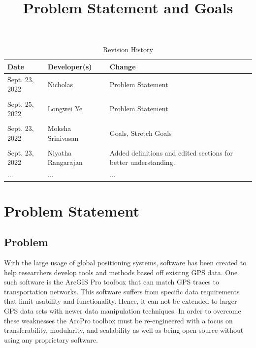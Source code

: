 \documentclass{article}
\title{Problem Statement and Goals\\\progname}
\author{\authname}
\date{}
\begin{document}
\maketitle

\begin{table}[hp]
\caption{Revision History} \label{TblRevisionHistory}
\begin{tabularx}{\textwidth}{llX}
\toprule
\textbf{Date} & \textbf{Developer(s)} & \textbf{Change}\\
\midrule
Sept. 23, 2022 & Nicholas & Problem Statement\\\\
Sept. 25, 2022 & Longwei Ye & Problem Statement\\\\
Sept. 23, 2022 & Moksha Srinivasan & Goals, Stretch Goals\\\\
Sept. 23, 2022 & Niyatha Rangarajan & Added definitions and edited sections for better understanding.\\
... & ... & ...\\
\bottomrule
\end{tabularx}
\end{table}
\newpage
\section{Problem Statement}



\subsection{Problem}
With the large usage of global positioning systems, software has been created to help researchers develop tools and methods based off exisitng GPS data. 
One such software is the ArcGIS Pro toolbox that can match GPS traces to transportation networks. This software suffers from specific data requirements that limit usability and functionality. Hence, it can not be extended to larger GPS data sets with newer data manipulation techniques. In order to overcome these weaknesses the ArcPro toolbox must be re-engineered with a focus 
on transferability, modularity, and scalability as well as being open source without using any proprietary software. 
\end{document}
